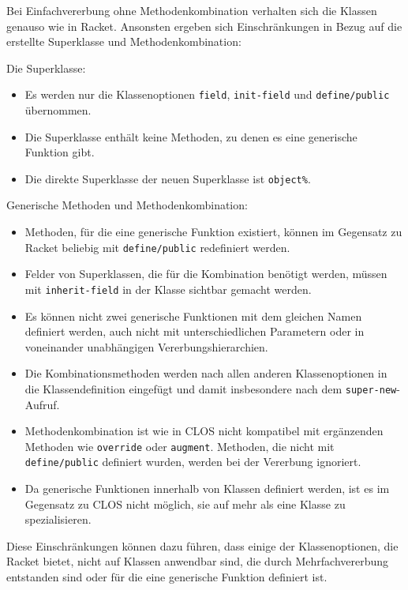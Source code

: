 Bei Einfachvererbung ohne Methodenkombination verhalten sich die Klassen genauso wie in Racket. Ansonsten ergeben sich Einschränkungen in Bezug auf die erstellte Superklasse und Methodenkombination:

Die Superklasse:
\begin{itemize}
 \item Es werden nur die Klassenoptionen \texttt{field}, \texttt{init-field} und \texttt{define/public} übernommen.
 \item Die Superklasse enthält keine Methoden, zu denen es eine generische Funktion gibt.
 \item Die direkte Superklasse der neuen Superklasse ist \texttt{object\%}.
\end{itemize}

Generische Methoden und Methodenkombination:
\begin{itemize}
 \item Methoden, für die eine generische Funktion existiert, können im Gegensatz zu Racket beliebig mit \texttt{define/public} redefiniert werden.
 \item Felder von Superklassen, die für die Kombination benötigt werden, müssen mit \texttt{inherit-field} in der Klasse sichtbar gemacht werden.
 \item Es können nicht zwei generische Funktionen mit dem gleichen Namen definiert werden, auch nicht mit unterschiedlichen Parametern oder in voneinander unabhängigen Vererbungshierarchien.
 \item Die Kombinationsmethoden werden nach allen anderen Klassenoptionen in die Klassendefinition eingefügt und damit insbesondere nach dem \texttt{super-new}-Aufruf.
 \item Methodenkombination ist wie in CLOS nicht kompatibel mit ergänzenden Methoden wie \texttt{override} oder \texttt{augment}. Methoden, die nicht mit \texttt{define/public} definiert wurden, werden bei der Vererbung ignoriert.
 \item Da generische Funktionen innerhalb von Klassen definiert werden, ist es im Gegensatz zu CLOS nicht möglich, sie auf mehr als eine Klasse zu spezialisieren.
\end{itemize}

Diese Einschränkungen können dazu führen, dass einige der Klassenoptionen, die Racket bietet, nicht auf Klassen anwendbar sind, die durch Mehrfachvererbung entstanden sind oder für die eine generische Funktion definiert ist.

